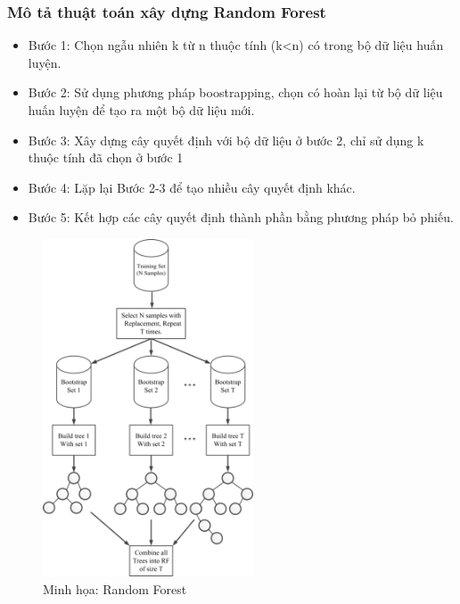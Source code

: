     \subsubsection{Mô tả thuật toán xây dựng Random Forest}
    
    \begin{itemize}
        \item Bước 1: Chọn ngẫu nhiên k từ n thuộc tính (k<n) có trong bộ dữ liệu huấn luyện.
        
        \item Bước 2: Sử dụng phương pháp boostrapping, chọn có hoàn lại từ bộ dữ liệu huấn luyện để tạo ra một bộ dữ liệu mới.
        
        \item Bước 3: Xây dựng cây quyết định với bộ dữ liệu ở bước 2, chỉ sử dụng k thuộc tính đã chọn ở bước 1
        
        \item Bước 4: Lặp lại Bước 2-3 để tạo nhiều cây quyết định khác.
        
        \item Bước 5: Kết hợp các cây quyết định thành phần bằng phương pháp bỏ phiếu.
    \end{itemize}
    
    \begin{figure}[htp]
        \centering
        \includegraphics[width=8 cm, height=10cm]{images/Structure-of-random-forest.png}
        \caption{Minh họa: Random Forest \cite{RF_structure}}
        \label{fig:RF}
    \end{figure}
    
